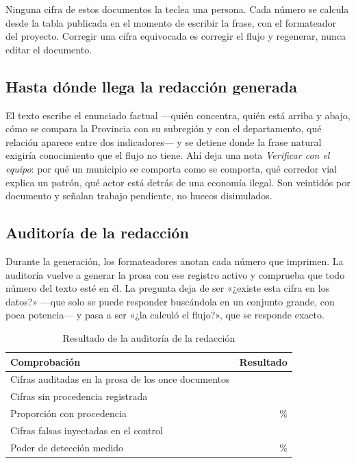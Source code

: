 \documentclass[11pt,a4paper]{article}
\begin{document}
\begin{regla}[title={Regla 10 — la prosa no transcribe, calcula}]
Ninguna cifra de estos documentos la teclea una persona. Cada número se calcula
desde la tabla publicada en el momento de escribir la frase, con el formateador
del proyecto. Corregir una cifra equivocada es corregir el flujo y regenerar,
nunca editar el documento.
\end{regla}

\subsection{Hasta dónde llega la redacción generada}

El texto escribe el enunciado factual —quién concentra, quién está arriba y
abajo, cómo se compara la Provincia con su subregión y con el departamento, qué
relación aparece entre dos indicadores— y se detiene donde la frase natural
exigiría conocimiento que el flujo no tiene. Ahí deja una nota
\textit{Verificar con el equipo}: por qué un municipio se comporta como se
comporta, qué corredor vial explica un patrón, qué actor está detrás de una
economía ilegal. Son veintidós por documento y señalan trabajo pendiente, no
huecos disimulados.

\subsection{Auditoría de la redacción}

\begin{regla}[title={Regla 11 — cada cifra impresa queda registrada}]
Durante la generación, los formateadores anotan cada número que imprimen. La
auditoría vuelve a generar la prosa con ese registro activo y comprueba que
todo número del texto esté en él. La pregunta deja de ser «¿existe esta cifra en
los datos?» —que solo se puede responder buscándola en un conjunto grande, con
poca potencia— y pasa a ser «¿la calculó el flujo?», que se responde exacto.
\end{regla}

\begin{table}[htbp]\centering
\caption{Resultado de la auditoría de la redacción}
\small
\noindent\begin{tabularx}{\linewidth}{X r}
\toprule
\textbf{Comprobación} & \textbf{Resultado} \\
\midrule
Cifras auditadas en la prosa de los once documentos & \cifraProsaAuditada{} \\
Cifras sin procedencia registrada & \cifraProsaSinOrigen{} \\
Proporción con procedencia & \cifraProsaPct{}\,\% \\
\addlinespace
Cifras falsas inyectadas en el control & \cifraFalsasProbadas{} \\
Poder de detección medido & \cifraPoderDeteccion{}\,\% \\
\bottomrule
\end{tabularx}
\end{table}
\end{document}
